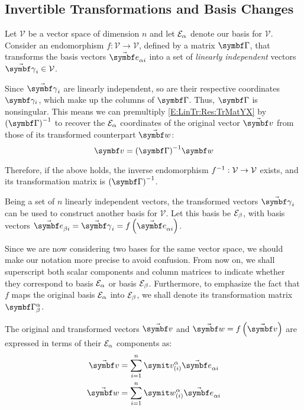 \subsection{Invertible Transformations and Basis Changes}
Let $\mathcal{V}$ be a vector space of dimension $n$ and let $\basis[\alpha]$ denote our basis for $\mathcal{V}$. Consider an endomorphism $f:\mathcal{V}\rightarrow\mathcal{V}$, defined by a matrix $\mat{\Gamma}$, that transforms the basis vectors $\vasub{\bv}{\mathcal{\alpha} i}$ into a set of \emph{linearly independent} vectors $\vasub{\gamma}{i}\in\mathcal{V}$.

Since $\vasub{\gamma}{i}$ are linearly independent, so are their respective coordinates $\vsub{\gamma}{i}$, which make up the columns of $\mat{\Gamma}$. Thus, $\mat{\Gamma}$ is nonsingular. This means we can premultiply \eqref{E:LinTr:Res:TrMatYX} by $\invp{\mat{\Gamma}}$ to recover the $\basis[\alpha]$ coordinates of the original vector $\vabs{v}$ from those of its transformed counterpart $\vabs{w}$:
\begin{equation} \label{E:LinTr:Res:TrMatXY}
\mcol{v}=\invp{\mat{\Gamma}} \mcol{w}
\end{equation}

Therefore, if the above holds, the inverse endomorphism $\inv{f}:\mathcal{V}\rightarrow\mathcal{V}$ exists, and its transformation matrix is $\invp{\mat{\Gamma}}$.

Being a set of $n$ linearly independent vectors, the transformed vectors $\vasub{\gamma}{i}$ can be used to construct another basis for $\mathcal{V}$. Let this basis be $\basis[\beta]$, with basis vectors $\vasub{\bv}{\beta i} = \vasub{\gamma}{i} = f\left(\vasub{\bv}{\alpha i}\right)$.

Since we are now considering two bases for the same vector space, we should make our notation more precise to avoid confusion. From now on, we shall superscript both scalar components and column matrices to indicate whether they correspond to basis $\basis[\alpha]$ or basis $\basis[\beta]$. Furthermore, to emphasize the fact that $f$ maps the original basis $\basis[\alpha]$ into $\basis[\beta]$, we shall denote its transformation matrix $\AutM{\alpha}{\beta}$.

The original and transformed vectors $\vabs{v}$ and $\vabs{w}=f\left(\vabs{v}\right)$ are expressed in terms of their $\basis[\alpha]$ components as:
\begin{gather}
\vabs{v}=\sum_{i=1}^{n} \cprj{v}{\alpha}{i} \vasub{\bv}{\alpha i} \label{E:LinTr:Res:VInAlpha} \\
\vabs{w}=\sum_{i=1}^{n} \cprj{w}{\alpha}{i} \vasub{\bv}{\alpha i} \label{E:LinTr:Res:WInAlpha}
\end{gather}

